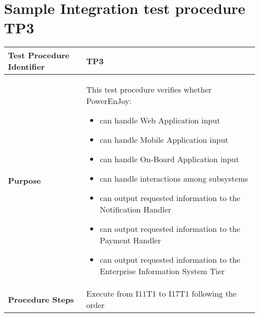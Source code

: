\section{Sample Integration test procedure TP3} \label{TP3}
\begin{center}
	\vspace{0.6cm}
	\begin{tabular}{|l|p{9cm}|}
		\hline
		\textbf{Test Procedure Identifier} & TP3 \bigstrut \\\hline
		\textbf{Purpose} 
		& This test procedure verifies whether PowerEnJoy: 
		\begin{itemize} 
			\item can handle Web Application input
			\item can handle Mobile Application input
			\item can handle On-Board Application input
			\item can handle interactions among subsystems 
			\item can output requested information to the Notification Handler
			\item can output requested information to the Payment Handler
			\item can output requested information to the Enterprise Information System Tier
		\end{itemize} \bigstrut \\\hline
		\textbf{Procedure Steps} & Execute from I11T1 to I17T1 following the order \bigstrut \\\hline
	\end{tabular}
\end{center}